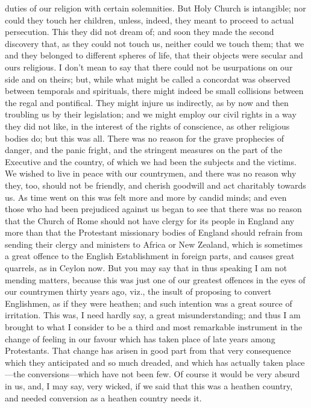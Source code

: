 duties of our religion with certain solemnities. But Holy Church is
intangible; nor could they touch her children, unless, indeed, they
meant to proceed to actual persecution. This they did not dream of;
and soon they made the second discovery that, as they could not touch
us, neither could we touch them; that we and they belonged to
different spheres of life, that their objects were secular and ours
religious. I don't mean to say that there could not be usurpations on
our side and on theirs; but, while what might be called a concordat
was observed between temporals and spirituals, there might indeed be
small collisions between the regal and pontifical. They might injure
us indirectly, as by now and then troubling us by their legislation;
and we might employ our civil rights in a way they did not like, in
the interest of the rights of conscience, as other religious bodies
do; but this was all. There was no reason for the grave prophecies of
danger, and the panic fright, and the stringent measures on the part
of the Executive and the country, of which we had been the subjects
and the victims. We wished to live in peace with our countrymen, and
there was no reason why they, too, should not be friendly, and cherish
goodwill and act charitably towards us. As time went on this was felt
more and more by candid minds; and even those who had been prejudiced
against us began to see that there was no reason that the Church of
Rome should not have clergy for its people in England any more than
that the Protestant missionary bodies of England should refrain from
sending their clergy and ministers to Africa or New Zealand, which is
sometimes a great offence to the English Establishment in foreign
parts, and causes great quarrels, as in Ceylon now. But you may say
that in thus speaking I am not mending matters, because this was just
one of our greatest offences in the eyes of our countrymen thirty
years ago, viz., the insult of proposing to convert Englishmen, as if
they were heathen; and such intention was a great source of
irritation. This was, I need hardly say, a great misunderstanding;
and thus I am brought to what I consider to be a third and most
remarkable instrument in the change of feeling in our favour which has
taken place of late years among Protestants. That change has arisen in
good part from that very consequence which they anticipated and so
much dreaded, and which has actually taken place—the
conversions—which have not been few. Of course it would be very
absurd in us, and, I may say, very wicked, if we said that this was a
heathen country, and needed conversion as a heathen country needs it.

